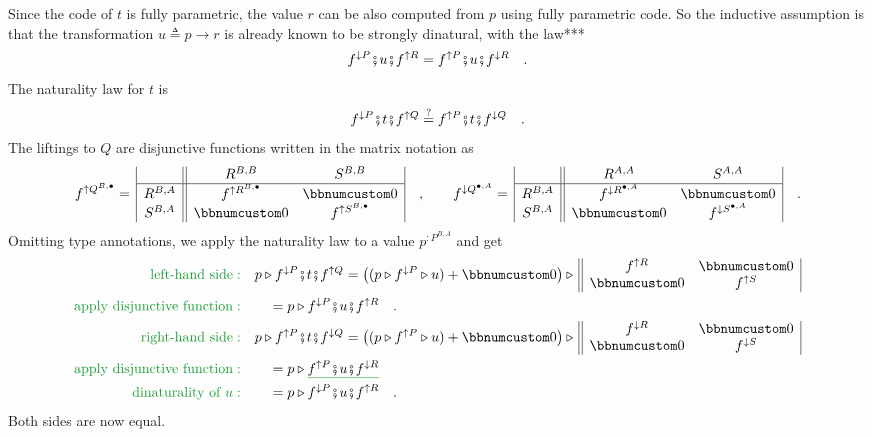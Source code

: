 Since the code of $t$ is fully parametric, the value $r$ can be
also computed from $p$ using fully parametric code. So the inductive
assumption is that the transformation $u\triangleq p\rightarrow r$
is already known to be strongly dinatural, with the law{*}{*}{*}
\[
f^{\downarrow P}\bef u\bef f^{\uparrow R}=f^{\uparrow P}\bef u\bef f^{\downarrow R}\quad.
\]
 The naturality law for $t$ is
\[
f^{\downarrow P}\bef t\bef f^{\uparrow Q}\overset{?}{=}f^{\uparrow P}\bef t\bef f^{\downarrow Q}\quad.
\]
The liftings to $Q$ are disjunctive functions written in the matrix
notation as
\[
f^{\uparrow Q^{B,\bullet}}=\,\begin{array}{|c||cc|}
 & R^{B,B} & S^{B,B}\\
\hline R^{B,A} & f^{\uparrow R^{B,\bullet}} & \bbnum 0\\
S^{B,A} & \bbnum 0 & f^{\uparrow S^{B,\bullet}}
\end{array}\quad,\quad\quad f^{\downarrow Q^{\bullet,A}}=\,\begin{array}{|c||cc|}
 & R^{A,A} & S^{A,A}\\
\hline R^{B,A} & f^{\downarrow R^{\bullet,A}} & \bbnum 0\\
S^{B,A} & \bbnum 0 & f^{\downarrow S^{\bullet,A}}
\end{array}\quad.
\]
Omitting type annotations, we apply the naturality law to a value
$p^{:P^{B,A}}$ and get
\begin{align*}
{\color{greenunder}\text{left-hand side}:}\quad & p\triangleright f^{\downarrow P}\bef t\bef f^{\uparrow Q}=\big((p\triangleright f^{\downarrow P}\triangleright u)+\bbnum 0\big)\triangleright\,\begin{array}{||cc|}
f^{\uparrow R} & \bbnum 0\\
\bbnum 0 & f^{\uparrow S}
\end{array}\\
{\color{greenunder}\text{apply disjunctive function}:}\quad & \quad=p\triangleright f^{\downarrow P}\bef u\bef f^{\uparrow R}\quad.\\
{\color{greenunder}\text{right-hand side}:}\quad & p\triangleright f^{\uparrow P}\bef t\bef f^{\downarrow Q}=\big((p\triangleright f^{\uparrow P}\triangleright u)+\bbnum 0\big)\triangleright\,\begin{array}{||cc|}
f^{\downarrow R} & \bbnum 0\\
\bbnum 0 & f^{\downarrow S}
\end{array}\\
{\color{greenunder}\text{apply disjunctive function}:}\quad & \quad=p\triangleright\gunderline{f^{\uparrow P}\bef u\bef f^{\downarrow R}}\\
{\color{greenunder}\text{dinaturality of }u:}\quad & \quad=p\triangleright f^{\downarrow P}\bef u\bef f^{\uparrow R}\quad.
\end{align*}
Both sides are now equal.

